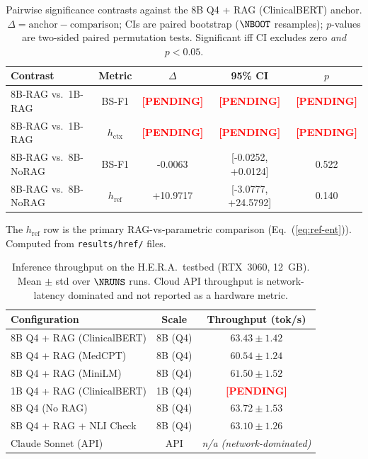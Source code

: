 \begin{table}[t]
\centering
\caption{Pairwise significance contrasts against the 8B Q4 + RAG
(ClinicalBERT) anchor. $\Delta = \text{anchor} - \text{comparison}$;
CIs are paired bootstrap ($\NBOOT$ resamples); $p$-values are
two-sided paired permutation tests. Significant iff CI excludes
zero \emph{and} $p<0.05$.}
\label{tab:pairwise_significance}
\setlength{\tabcolsep}{4pt}
\begin{tabular}{@{}lcccc@{}}
\toprule
\textbf{Contrast} & \textbf{Metric} & \textbf{$\Delta$} & \textbf{95\% CI} & \textbf{$p$} \\
\midrule
8B-RAG vs.\ 1B-RAG   & BS-F1 & \textcolor{red}{\textbf{[PENDING]}} & \textcolor{red}{\textbf{[PENDING]}} & \textcolor{red}{\textbf{[PENDING]}} \\
8B-RAG vs.\ 1B-RAG   & $h_{\mathrm{ctx}}$ & \textcolor{red}{\textbf{[PENDING]}} & \textcolor{red}{\textbf{[PENDING]}} & \textcolor{red}{\textbf{[PENDING]}} \\
8B-RAG vs.\ 8B-NoRAG & BS-F1 & -0.0063 & [-0.0252, +0.0124] & 0.522 \\
8B-RAG vs.\ 8B-NoRAG & $h_{\mathrm{ref}}$ & +10.9717 & [-3.0777, +24.5792] & 0.140 \\
\bottomrule
\end{tabular}
\vspace{2pt}
\begin{flushleft}
\footnotesize{%
The $h_{\mathrm{ref}}$ row is the primary RAG-vs-parametric
comparison (Eq.~(\ref{eq:ref-ent})). Computed from \texttt{results/href/} files.
}
\end{flushleft}
\end{table}

\begin{table}[t]
\centering
\caption{Inference throughput on the H.E.R.A.\ testbed
(RTX~3060, 12~GB). Mean $\pm$ std over $\NRUNS$ runs.
Cloud API throughput is network-latency dominated and not
reported as a hardware metric.}
\label{tab:latency}
\setlength{\tabcolsep}{6pt}
\begin{tabular}{@{}lcc@{}}
\toprule
\textbf{Configuration} & \textbf{Scale} & \textbf{Throughput (tok/s)} \\
\midrule
8B Q4 + RAG (ClinicalBERT) & 8B (Q4) & $63.43 \pm 1.42$ \\
8B Q4 + RAG (MedCPT) & 8B (Q4) & $60.54 \pm 1.24$ \\
8B Q4 + RAG (MiniLM) & 8B (Q4) & $61.50 \pm 1.52$ \\
1B Q4 + RAG (ClinicalBERT) & 1B (Q4) & \textcolor{red}{\textbf{[PENDING]}} \\
8B Q4 (No RAG) & 8B (Q4) & $63.72 \pm 1.53$ \\
8B Q4 + RAG + NLI Check & 8B (Q4) & $63.10 \pm 1.26$ \\
Claude Sonnet (API) & API & \textit{n/a (network-dominated)} \\
\bottomrule
\end{tabular}
\end{table}


